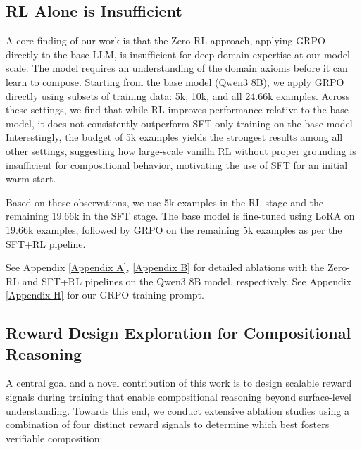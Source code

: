 \documentclass{article}
\theoremstyle{plain}
\theoremstyle{definition}
\theoremstyle{remark}
\begin{document}
\enlargethispage{2\baselineskip}
\subsection{RL Alone is Insufficient}
\label{RL_ablations}
A core finding of our work is that the Zero-RL approach, applying GRPO directly to the base LLM, is insufficient for deep domain expertise at our model scale. The model requires an understanding of the domain axioms before it can learn to compose. Starting from the base model (Qwen3 8B), we apply GRPO directly using subsets of training data: 5k, 10k, and all 24.66k examples. Across these settings, we find that while RL improves performance relative to the base model, it does not consistently outperform SFT-only training on the base model. Interestingly, the budget of 5k examples yields the strongest results among all other settings, suggesting how large-scale vanilla RL without proper grounding is insufficient for compositional behavior, motivating the use of SFT for an initial warm start. 

Based on these observations, we use 5k examples in the RL stage and the remaining 19.66k in the SFT stage. The base model is fine-tuned using LoRA on 19.66k examples, followed by GRPO on the remaining 5k examples as per the SFT+RL pipeline.

See Appendix \ref{Appendix A}, \ref{Appendix B} for detailed ablations with the Zero-RL and SFT+RL pipelines on the Qwen3 8B model, respectively. See Appendix \ref{Appendix H} for our GRPO training prompt.

\enlargethispage{2\baselineskip} %
\subsection{Reward Design Exploration for Compositional Reasoning} %
A central goal and a novel contribution of this work is to design scalable reward signals during training that enable compositional reasoning beyond surface-level understanding. Towards this end, we conduct extensive ablation studies using a combination of four distinct reward signals to determine which best fosters verifiable composition:

\end{document}
